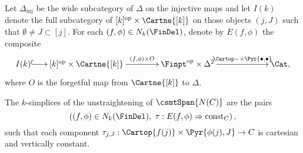 \documentclass[a4paper]{article}
\numberwithin{equation}{section}
\begin{document}
Let $\Delta_{\mathrm{inj}}$ be the wide subcategory of $\Delta$ on the injective maps and let $I(k)$ denote the full subcategory of $[k]^{\rm op} \times \Cartne {[k]}$ on those objects $(j,J)$ such that $\emptyset \neq J \subset [j]$. For each $(f,\phi)\in N_k(\FinDel)$, denote by $E(f,\phi)$ the composite 
 \begin{equation*}
  \xymatrixcolsep{1.4pc}\xymatrix{I(k) \ar@{^{(}->}[r] & [k]^{\rm op} \times \Cartne {[k]} \ar[rr]^-{(f,\phi) \times O} & & \Finpt^{\rm op} \times \Delta^2 \ar[rrr]^-{\Cartop - \times \Pyr {\bullet,\bullet}} & & & \Cat,}
 \end{equation*}
 where $O$ is the forgetful map from $\Cartne {[k]}$ to $\Delta$.

 
 \begin{lem}
  The $k$-simplices of the unstraightening of $\csmtSpan{N(C)}$ are the pairs
\begin{equation*}
\left((f,\phi)\in N_k(\FinDel), \ \tau: E(f,\phi) \Rightarrow {\rm const}_C\right),
\end{equation*}
such that each component $\tau_{j,J}:\Cartop {f(j)} \times \Pyr{\phi(j),J} \to C$ is cartesian and vertically constant.
 \end{lem}
\end{document}
